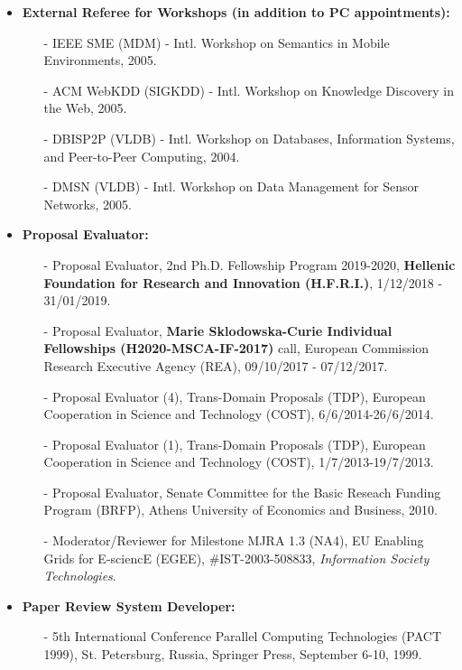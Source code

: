 \documentclass[10pt]{article}
\begin{document}
\begin{itemize}
\item {\bf External Referee for Workshops (in addition to PC appointments):}
\begin{itemize}
\setlength{\itemsep}{0.10ex}
\item[-] IEEE SME (MDM) - Intl. Workshop on Semantics in Mobile Environments, 2005.
\item[-] ACM WebKDD (SIGKDD) - Intl. Workshop on Knowledge Discovery in the Web, 2005.
\item[-] DBISP2P (VLDB) - Intl. Workshop on Databases, Information Systems, and Peer-to-Peer Computing, 2004.
\item[-] DMSN (VLDB) - Intl. Workshop on Data Management for Sensor Networks, 2005.
\end{itemize}

\item  {\bf Proposal Evaluator:}
\begin{itemize}
\setlength{\itemsep}{0.10ex}
\item[-] Proposal Evaluator, 2nd Ph.D. Fellowship Program 2019-2020, {\bf Hellenic Foundation for Research and Innovation (H.F.R.I.)}, 1/12/2018 - 31/01/2019. %
\item[-] Proposal Evaluator, {\bf Marie Sklodowska-Curie Individual Fellowships (H2020-MSCA-IF-2017)} call, European Commission Research Executive Agency (REA), 09/10/2017 - 07/12/2017. %
\item[-] Proposal Evaluator (4), Trans-Domain Proposals (TDP), European Cooperation in Science and Technology (COST), 6/6/2014-26/6/2014.
\item[-] Proposal Evaluator (1), Trans-Domain Proposals (TDP), European Cooperation in Science and Technology (COST), 1/7/2013-19/7/2013.
\item[-] Proposal Evaluator, Senate Committee for the Basic Reseach Funding Program (BRFP), Athens University of Economics and Business, 2010.
\item[-] Moderator/Reviewer for Milestone MJRA 1.3 (NA4), EU Enabling Grids for E-sciencE (EGEE), \#IST-2003-508833, {\em Information Society Technologies}.
\end{itemize}

\item  {\bf Paper Review System Developer:}
\begin{itemize}
\setlength{\itemsep}{0.10ex}
\item[-]  5th International Conference Parallel Computing Technologies (PACT 1999), St. Petersburg, Russia, Springer Press, September 6-10, 1999.
\end{itemize}


\end{itemize}
\end{document}
